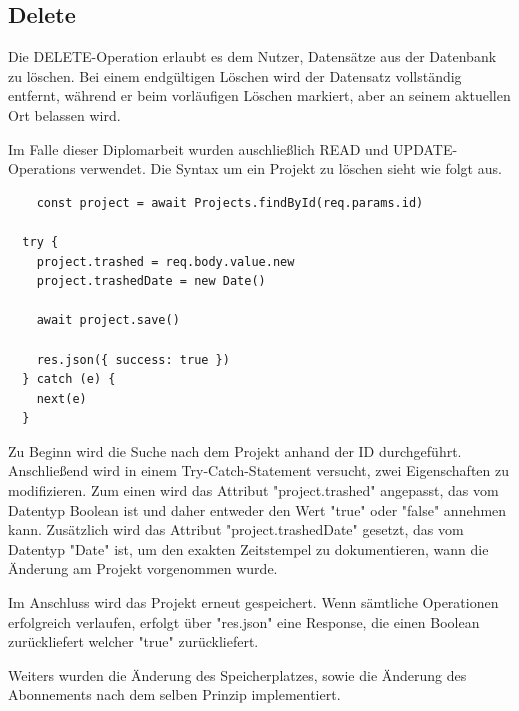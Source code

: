 \subsection{Delete}


Die DELETE-Operation erlaubt es dem Nutzer, Datensätze aus der Datenbank zu löschen. Bei einem endgültigen Löschen wird der Datensatz vollständig entfernt, während er beim vorläufigen Löschen markiert, aber an seinem aktuellen Ort belassen wird.



Im Falle dieser Diplomarbeit wurden auschließlich READ und UPDATE-Operations verwendet. Die Syntax um ein Projekt zu löschen sieht wie folgt aus.

\begin{lstlisting}
    const project = await Projects.findById(req.params.id)

  try {
    project.trashed = req.body.value.new
    project.trashedDate = new Date()

    await project.save()

    res.json({ success: true })
  } catch (e) {
    next(e)
  }
\end{lstlisting}

Zu Beginn wird die Suche nach dem Projekt anhand der ID durchgeführt. Anschließend wird in einem Try-Catch-Statement versucht, zwei Eigenschaften zu modifizieren. Zum einen wird das Attribut "project.trashed" angepasst, das vom Datentyp Boolean ist und daher entweder den Wert "true" oder "false" annehmen kann. Zusätzlich wird das Attribut "project.trashedDate" gesetzt, das vom Datentyp "Date" ist, um den exakten Zeitstempel zu dokumentieren, wann die Änderung am Projekt vorgenommen wurde.

Im Anschluss wird das Projekt erneut gespeichert. Wenn sämtliche Operationen erfolgreich verlaufen, erfolgt über "res.json" eine Response, die einen Boolean zurückliefert welcher "true" zurückliefert.


Weiters wurden die Änderung des Speicherplatzes, sowie die Änderung des Abonnements nach dem selben Prinzip implementiert.

\cite{CRUD_Operations}